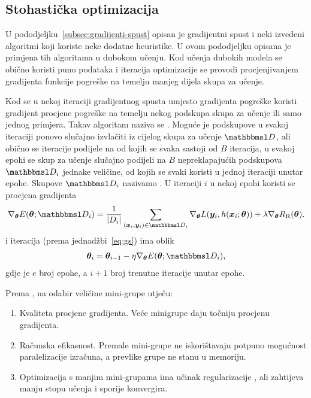 \documentclass[utf8, diplomski, lmodern]{fer}
\begin{document}
\subsection{Stohastička optimizacija} \label{subsec:dukn-stoh-optimizacija}

U pododjeljku~\ref{subsec:gradijenti-spust} opisan je gradijentni spust i neki izvedeni algoritmi koji koriste neke dodatne heuristike. U ovom pododjeljku opisana je primjena tih algoritama u dubokom učenju. Kod učenja dubokih modela se obično koristi puno podataka i iteracija optimizacije se provodi procjenjivanjem gradijenta funkcije pogreške na temelju manjeg dijela skupa za učenje.

Kod  se u nekoj iteraciji gradijentnog spusta umjesto gradijenta pogreške koristi gradijent procjene pogreške na temelju nekog podskupa skupa za učenje ili samo jednog primjera. Takav algoritam naziva se . Moguće je podskupove u svakoj iteraciji ponovo slučajno izvlačiti iz cijelog skupa za učenje $\set D$, ali obično se iteracije podijele na  od kojih se svaka sastoji od $B$ iteracija, u svakoj epohi se skup za učenje slučajno podijeli na $B$ nepreklapajućih podskupova $\set D_i$ jednake veličine, od kojih se svaki koristi u jednoj iteraciji unutar epohe. Skupove $\set D_i$ nazivamo . U iteraciji $i$ u nekoj epohi koristi se procjena gradijenta
\begin{align} \label{eq:sgs-ucenje}
\nabla_{\vec\theta}E(\vec\theta;\set D_i) = \frac{1}{\envert{D_i}}\sum_{(\vec x_i,\vec y_i)\in\set D_i} \nabla_{\vec\theta}L(\vec y_i,h(\vec x_i;\vec\theta)) + \lambda \nabla_{\vec\theta}R_\text{R}(\vec\theta) \text{.}
\end{align}
i iteracija (prema jednadžbi~\eqref{eq:gs}) ima oblik
\begin{align} \label{eq:sgs}
\vec \theta_i = \vec \theta_{i-1} - \eta\nabla_{\vec\theta}E(\vec\theta;\set D_{i})\text{,}
\end{align}
gdje je $e$ broj epohe, a $i+1$ broj trenutne iteracije unutar epohe.

Prema \citet{Goodfellow:2016:DL}, na odabir veličine mini-grupe utječu:
\begin{enumerate}
	\item Kvaliteta procjene gradijenta. Veće minigrupe daju točniju procjenu gradijenta.
	\item Računska efikasnost. Premale mini-grupe ne iskorištavaju potpuno mogućnost paralelizacije izračuna, a prevlike grupe ne stanu u memoriju.
	\item Optimizacija s manjim mini-grupama ima učinak regularizacije \citep{Wilson:2003:GIBTGDL}, ali zahtijeva manju stopu učenja i sporije konvergira.
\end{enumerate}
\end{document}
